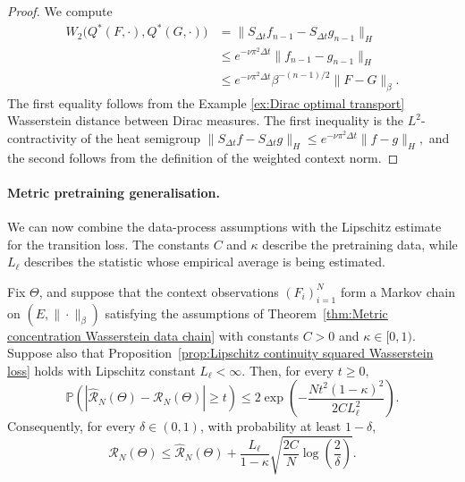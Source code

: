 \begin{proof}
We compute
\[
\begin{aligned}
W_2
\bigl(
Q^*(F,\cdot),
Q^*(G,\cdot)
\bigr)
&=
\|S_{\Delta t}f_{n-1}-S_{\Delta t}g_{n-1}\|_H
\\
&\leqslant
e^{-\nu\pi^2\Delta t}
\|f_{n-1}-g_{n-1}\|_H
\\
&\leqslant
e^{-\nu\pi^2\Delta t}
\beta^{-(n-1)/2}
\|F-G\|_\beta.
\end{aligned}
\]
The first equality follows from the Example \ref{ex:Dirac optimal transport} Wasserstein distance between Dirac measures. The first inequality is the \(L^2\)-contractivity of the heat semigroup \(
\|S_{\Delta t}f-S_{\Delta t}g\|_H
\leqslant
e^{-\nu\pi^2\Delta t}
\|f-g\|_H,
\) and the second follows from the definition of the weighted context norm.
\end{proof}

\paragraph{Metric pretraining generalisation.}

We can now combine the data-process assumptions with the Lipschitz estimate for the transition loss. The constants \(C\) and \(\kappa\) describe the pretraining data, while \(L_\ell\) describes the statistic whose empirical average is being estimated.

\begin{theorem}
\label{thm:Fixed-parameter metric generalisation bound}
Fix \(\Theta\), and suppose that the context observations \((F_i)_{i=1}^N\) form a Markov chain on \((E,\|\cdot\|_\beta)\) satisfying the assumptions of Theorem~\ref{thm:Metric concentration Wasserstein data chain} with constants \(C>0\) and \(\kappa\in[0,1)\). Suppose also that Proposition~\ref{prop:Lipschitz continuity squared Wasserstein loss} holds with Lipschitz constant \(L_\ell<\infty\). Then, for every \(t\geq0\),
\[
\mathbb P
\left(
\left|
\widehat{\mathcal R}_N(\Theta)
-
\mathcal R_N(\Theta)
\right|
\geq t
\right)
\leqslant
2
\exp
\left(
-\frac{
Nt^2(1-\kappa)^2
}{
2CL_\ell^2
}
\right).
\]
Consequently, for every \(\delta\in(0,1)\), with probability at least \(1-\delta\),
\[
\mathcal R_N(\Theta)
\leqslant
\widehat{\mathcal R}_N(\Theta)
+
\frac{L_\ell}{1-\kappa}
\sqrt{
\frac{2C}{N}
\log\left(\frac2\delta\right)
}.
\]
\end{theorem}

